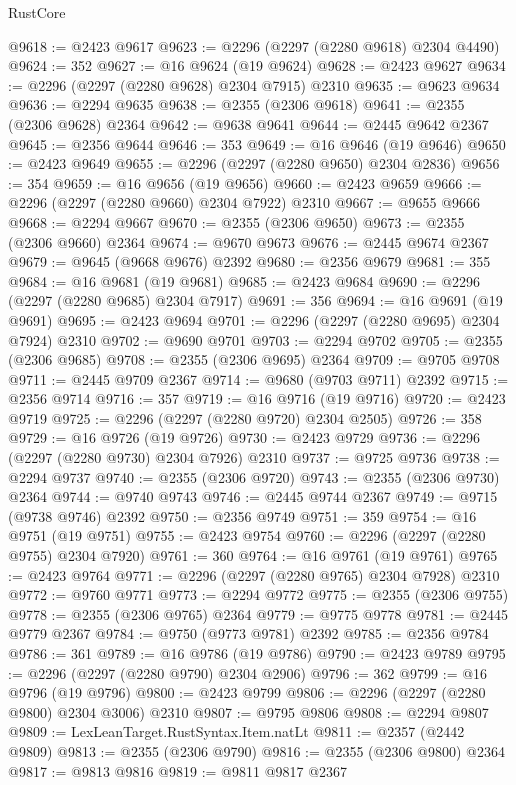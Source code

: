\begin{lexlean}{RustCore}
\begin{coremodule}
@9618 := @2423 @9617
@9623 := @2296 (@2297 (@2280 @9618) @2304 @4490)
@9624 := 352
@9627 := @16 @9624 (@19 @9624)
@9628 := @2423 @9627
@9634 := @2296 (@2297 (@2280 @9628) @2304 @7915) @2310
@9635 := @9623 @9634
@9636 := @2294 @9635
@9638 := @2355 (@2306 @9618)
@9641 := @2355 (@2306 @9628) @2364
@9642 := @9638 @9641
@9644 := @2445 @9642 @2367
@9645 := @2356 @9644
@9646 := 353
@9649 := @16 @9646 (@19 @9646)
@9650 := @2423 @9649
@9655 := @2296 (@2297 (@2280 @9650) @2304 @2836)
@9656 := 354
@9659 := @16 @9656 (@19 @9656)
@9660 := @2423 @9659
@9666 := @2296 (@2297 (@2280 @9660) @2304 @7922) @2310
@9667 := @9655 @9666
@9668 := @2294 @9667
@9670 := @2355 (@2306 @9650)
@9673 := @2355 (@2306 @9660) @2364
@9674 := @9670 @9673
@9676 := @2445 @9674 @2367
@9679 := @9645 (@9668 @9676) @2392
@9680 := @2356 @9679
@9681 := 355
@9684 := @16 @9681 (@19 @9681)
@9685 := @2423 @9684
@9690 := @2296 (@2297 (@2280 @9685) @2304 @7917)
@9691 := 356
@9694 := @16 @9691 (@19 @9691)
@9695 := @2423 @9694
@9701 := @2296 (@2297 (@2280 @9695) @2304 @7924) @2310
@9702 := @9690 @9701
@9703 := @2294 @9702
@9705 := @2355 (@2306 @9685)
@9708 := @2355 (@2306 @9695) @2364
@9709 := @9705 @9708
@9711 := @2445 @9709 @2367
@9714 := @9680 (@9703 @9711) @2392
@9715 := @2356 @9714
@9716 := 357
@9719 := @16 @9716 (@19 @9716)
@9720 := @2423 @9719
@9725 := @2296 (@2297 (@2280 @9720) @2304 @2505)
@9726 := 358
@9729 := @16 @9726 (@19 @9726)
@9730 := @2423 @9729
@9736 := @2296 (@2297 (@2280 @9730) @2304 @7926) @2310
@9737 := @9725 @9736
@9738 := @2294 @9737
@9740 := @2355 (@2306 @9720)
@9743 := @2355 (@2306 @9730) @2364
@9744 := @9740 @9743
@9746 := @2445 @9744 @2367
@9749 := @9715 (@9738 @9746) @2392
@9750 := @2356 @9749
@9751 := 359
@9754 := @16 @9751 (@19 @9751)
@9755 := @2423 @9754
@9760 := @2296 (@2297 (@2280 @9755) @2304 @7920)
@9761 := 360
@9764 := @16 @9761 (@19 @9761)
@9765 := @2423 @9764
@9771 := @2296 (@2297 (@2280 @9765) @2304 @7928) @2310
@9772 := @9760 @9771
@9773 := @2294 @9772
@9775 := @2355 (@2306 @9755)
@9778 := @2355 (@2306 @9765) @2364
@9779 := @9775 @9778
@9781 := @2445 @9779 @2367
@9784 := @9750 (@9773 @9781) @2392
@9785 := @2356 @9784
@9786 := 361
@9789 := @16 @9786 (@19 @9786)
@9790 := @2423 @9789
@9795 := @2296 (@2297 (@2280 @9790) @2304 @2906)
@9796 := 362
@9799 := @16 @9796 (@19 @9796)
@9800 := @2423 @9799
@9806 := @2296 (@2297 (@2280 @9800) @2304 @3006) @2310
@9807 := @9795 @9806
@9808 := @2294 @9807
@9809 := LexLeanTarget.RustSyntax.Item.natLt
@9811 := @2357 (@2442 @9809)
@9813 := @2355 (@2306 @9790)
@9816 := @2355 (@2306 @9800) @2364
@9817 := @9813 @9816
@9819 := @9811 @9817 @2367

\end{coremodule}
\end{lexlean}
